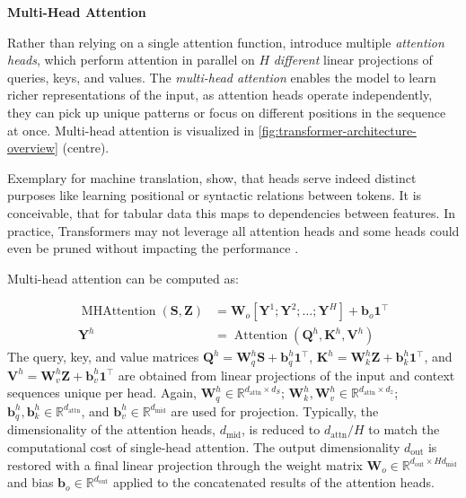 \textbf{Multi-Head Attention}

Rather than relying on a single attention function, \textcite[][4--5]{vaswaniAttentionAllYou2017} introduce multiple \emph{attention heads}, which perform attention in parallel on $H$ \emph{different} linear projections of queries, keys, and values. The \emph{multi-head attention} enables the model to learn richer representations of the input, as attention heads operate independently, they can pick up unique patterns or focus on different positions in the sequence at once. Multi-head attention is visualized in \cref{fig:transformer-architecture-overview} (centre).

Exemplary for machine translation, \textcite[][5795]{voitaAnalyzingMultiHeadSelfAttention2019} show, that heads serve indeed distinct purposes like learning positional or syntactic relations between tokens. It is conceivable, that for tabular data this maps to dependencies between features. In practice, Transformers may not leverage all attention heads and some heads could even be pruned without impacting the performance \autocites[][9]{michelAreSixteenHeads2019}[][5805]{voitaAnalyzingMultiHeadSelfAttention2019}.

Multi-head attention can be computed as:

\begin{equation}
    \begin{aligned}
        \operatorname{MHAttention}(\mathbf{S}, \mathbf{Z}) & = \mathbf{W}_{o}\left[\mathbf{Y}^{1};\mathbf{Y}^{2};\ldots;\mathbf{Y}^{H} \right] + \mathbf{b}_{o}\mathbf{1}^{\top} \\
        \mathbf{Y}^{h}                                     & = \operatorname{Attention}(\mathbf{Q}^h, \mathbf{K}^h, \mathbf{V}^h)
    \end{aligned}
\end{equation}
The query, key, and value matrices  $\mathbf{Q}^{h}=\mathbf{W}^h_q \mathbf{S} + \mathbf{b}^h_q\mathbf{1}^{\top}$, $\mathbf{K}^{h}=\mathbf{W}_k^h \mathbf{Z} + \mathbf{b}_k^h\mathbf{1}^{\top}$, and $\mathbf{V}^{h}=\mathbf{W}_v^h \mathbf{Z} + \mathbf{b}_v^h\mathbf{1}^{\top}$ are obtained from linear projections of the input and context sequences unique per head. Again, $\mathbf{W}^{h}_{q} \in \mathbb{R}^{d_{\mathrm{attn}}\times d_{S}}$; $\mathbf{W}^{h}_{k}, \mathbf{W}^{h}_{v} \in \mathbb{R}^{d_{\mathrm{attn}}\times d_z}$; $\mathbf{b}^h_q, \mathbf{b}^h_k \in \mathbb{R}^{d_{\mathrm{attn}}}$, and $\mathbf{b}^h_v \in \mathbb{R}^{d_{\mathrm{mid}}}$ are used for projection. Typically, the dimensionality of the attention heads, $d_{\mathrm{mid}}$, is reduced to $d_{\mathrm{attn}}/H$ to match the computational cost of single-head attention. The output dimensionality $d_{\mathrm{out}}$ is restored with a final linear projection through the weight matrix $\mathbf{W}_{o} \in \mathbb{R}^{d_{\mathrm{out}}\times Hd_{\mathrm{mid}}}$ and bias $\mathbf{b}_o \in \mathbb{R}^{d_{\mathrm{out}}}$ applied to the concatenated results of the attention heads.

